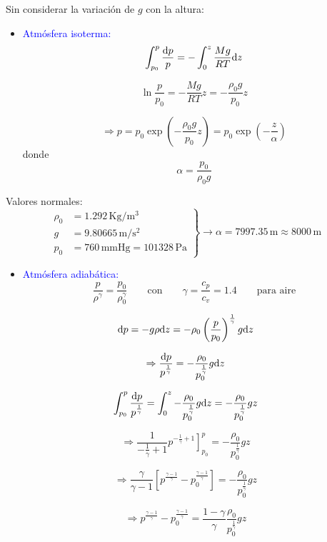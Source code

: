 Sin considerar la variación de $g$ con la altura: 
\begin{itemize}
\item \textcolor{blue}{Atmósfera isoterma:} 
\[
\int_{p_{0}}^{p}\frac{\text{d} p}{p}=-\int_{0}^{z}\frac{Mg}{RT}\text{d} z
\]
 
\[
\ln\frac{p}{p_{0}}=-\frac{Mg}{RT}z=-\frac{\rho_{0}g}{p_{0}}z
\]
 
\begin{equation}
\Rightarrow\boxed{p=p_{0}\exp\left(-\frac{\rho_{0}g}{p_{0}}z\right)=p_{0}\exp\left(-\frac{z}{\alpha}\right)}\label{eq:isotermica}
\end{equation}
 donde 
\[
\alpha=\frac{p_{0}}{\rho_{0}g}
\]
\end{itemize}
Valores normales: 
\[
\left.\begin{aligned}\rho_{0} & =1.292\,\text{Kg}/\text{m}^{3}\\
g & =9.80665\,\text{m}/\text{s}^{2}\\
p_{0} & =760\,\text{mmHg}=101328\,\text{Pa}
\end{aligned}
\right\} \rightarrow\alpha=7997.35\,\text{m}\approx8000\,\text{m}
\]



\begin{itemize}
\item \textcolor{blue}{Atmósfera adiabática:} 
\[
\frac{p}{\rho^{\gamma}}=\frac{p_{0}}{\rho_{0}^{\gamma}}\qquad\text{con}\qquad\gamma=\frac{c_{p}}{c_{v}}=1.4\qquad\text{para aire}
\]
\end{itemize}
\[
\text{d} p=-g\rho\text{d} z=-\rho_{0}\left(\frac{p}{p_{0}}\right)^{\frac{1}{\gamma}}g\text{d} z
\]
 
\[
\Rightarrow\frac{\text{d} p}{p^{\frac{1}{\gamma}}}=-\frac{\rho_{0}}{p_{0}^{\frac{1}{\gamma}}}g\text{d} z
\]

\[
\int_{p_{0}}^{p}\frac{\text{d} p}{p^{\frac{1}{\gamma}}}=\int_{0}^{z}-\frac{\rho_{0}}{p_{0}^{\frac{1}{\gamma}}}g\text{d} z=-\frac{\rho_{0}}{p_{0}^{\frac{1}{\gamma}}}gz
\]


\[
\Rightarrow\frac{1}{-\frac{1}{\gamma}+1}\left.p^{-\frac{1}{\gamma}+1}\right]_{p_{0}}^{p}=-\frac{\rho_{0}}{p_{0}^{\frac{1}{\gamma}}}gz
\]

\[
\Rightarrow\frac{\gamma}{\gamma-1}\left[p^{\frac{\gamma-1}{\gamma}}-p_{0}^{\frac{\gamma-1}{\gamma}}\right]=-\frac{\rho_{0}}{p_{0}^{\frac{1}{\gamma}}}gz
\]

\[
\Rightarrow p^{\frac{\gamma-1}{\gamma}}-p_{0}^{\frac{\gamma-1}{\gamma}}=\frac{1-\gamma}{\gamma}\frac{\rho_{0}}{p_{0}^{\frac{1}{\gamma}}}gz
\]

